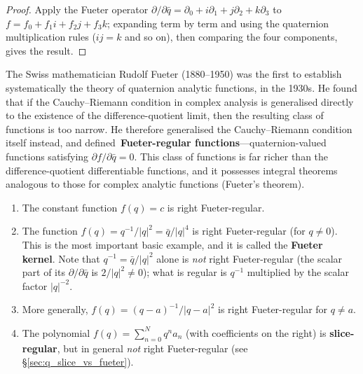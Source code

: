 \begin{proof}
Apply the Fueter operator $\partial/\partial\bar q=\partial_0+i\partial_1+j\partial_2+k\partial_3$ to $f=f_0+f_1i+f_2j+f_3k$; expanding term by term and using the quaternion multiplication rules ($ij=k$ and so on), then comparing the four components, gives the result.
\end{proof}

\begin{remark}\label{rem:q_fueter_history}
The Swiss mathematician Rudolf Fueter (1880--1950) was the first to establish systematically the theory of quaternion analytic functions, in the 1930s. He found that if the Cauchy--Riemann condition in complex analysis is generalised directly to the existence of the difference-quotient limit, then the resulting class of functions is too narrow. He therefore generalised the Cauchy--Riemann condition itself instead, and defined\ \textbf{Fueter-regular functions}---quaternion-valued functions satisfying $\partial f/\partial \bar q=0$. This class of functions is far richer than the difference-quotient differentiable functions, and it possesses integral theorems analogous to those for complex analytic functions (Fueter's theorem).
\end{remark}

\begin{example}\label{ex:q_regular_examples}
\begin{enumerate}[label=(\roman*)]
    \item The constant function $f(q)=c$ is right Fueter-regular.
    \item The function $f(q)=q^{-1}/|q|^2=\bar q/|q|^4$ is right Fueter-regular (for $q\neq 0$). This is the most important basic example, and it is called the \textbf{Fueter kernel}. Note that $q^{-1}=\bar q/|q|^2$ alone is \emph{not} right Fueter-regular (the scalar part of its $\partial/\partial\bar q$ is $2/|q|^2\neq 0$); what is regular is $q^{-1}$ multiplied by the scalar factor $|q|^{-2}$.
    \item More generally, $f(q)=(q-a)^{-1}/|q-a|^2$ is right Fueter-regular for $q\neq a$.
    \item The polynomial $f(q)=\sum_{n=0}^N q^n a_n$ (with coefficients on the right) is \textbf{slice-regular}, but in general \emph{not} right Fueter-regular (see \S\ref{sec:q_slice_vs_fueter}).
\end{enumerate}
\end{example}

